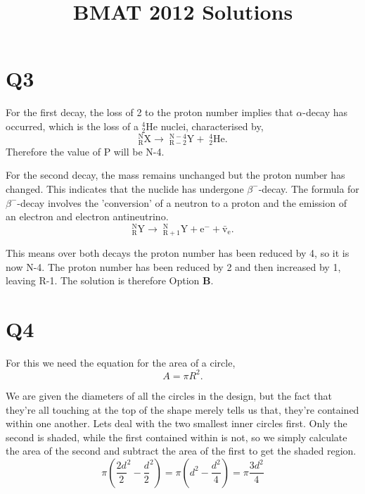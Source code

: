 \documentclass[11pt]{article}
\title{BMAT 2012 Solutions}
\author{}
\date{}                                           %
\begin{document}
\maketitle

\section*{Q3}
For the first decay, the loss of 2 to the proton number implies that $\alpha$-decay has occurred, which is the loss of a $\mathrm{^4_2He}$ nuclei, characterised by,
\begin{equation*}
\mathrm{^N_RX \rightarrow \; ^{N-4}_{R-2}Y + \; ^4_2He.}
\end{equation*}  
Therefore the value of P will be N-4.

For the second decay, the mass remains unchanged but the proton number has changed.  This indicates that the nuclide has undergone $\beta^-$-decay.  The formula for $\beta^-$-decay involves the 'conversion' of a neutron to a proton and the emission of an electron and electron antineutrino.  
\begin{equation}
\mathrm{^N_RY \rightarrow \; ^{N}_{R+1}Y + e^- + \bar{v}_e.}
\end{equation}

This means over both decays the proton number has been reduced by 4, so it is now N-4.  The proton number has been reduced by 2 and then increased by 1, leaving R-1.  The solution is therefore Option \textbf{B}.

\section*{Q4}
For this we need the equation for the area of a circle,
\begin{equation*}
A = \pi R^2.
\end{equation*}

We are given the diameters of all the circles in the design, but the fact that they're all touching at the top of the shape merely tells us that, they're contained within one another.  Lets deal with the two smallest inner circles first.  Only the second is shaded, while the first contained within is not, so we simply calculate the area of the second and subtract the area of the first to get the shaded region.
\begin{equation*}
\pi({\frac{2d}{2}}^2 -\frac{d}{2}^2) = \pi(d^2 - \frac{d^2}{4}) = \pi \frac{3d^2}{4}
\end{equation*}
\end{document}
